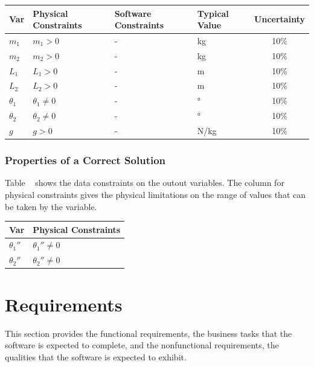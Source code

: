 \documentclass[12pt]{article}
\begin{document}
\begin{table}[H]
  \caption{Input Variables} \label{TblInputVar}
  \renewcommand{\arraystretch}{1.2}
\noindent \begin{longtable*}{l l l l c} 
  \toprule
  \textbf{Var} & \textbf{Physical Constraints} & \textbf{Software Constraints} &
                             \textbf{Typical Value} & \textbf{Uncertainty}\\
  \midrule 
  $m_1$ & $m_1 > 0$ & - & \si[per-mode=symbol] {\kilogram} & 10\%
  \\
  $m_2$ & $m_2 > 0$ & - & \si[per-mode=symbol] {\kilogram} & 10\%
  \\
  $L_1$ & $L_1 > 0$ & - & \si[per-mode=symbol] {\metre} & 10\%
  \\
  $L_2$ & $L_2 > 0$ & - & \si[per-mode=symbol] {\metre} & 10\%
  \\
  $\theta_1$ & $\theta_1 \neq 0$ & - & \si[per-mode=symbol] {\degree} & 10\%
  \\
  $\theta_2$ & $\theta_2 \neq 0$ & - & \si[per-mode=symbol] {\degree} & 10\%
  \\
  $g$ & $g > 0$ & - & \si[per-mode=symbol] {\newton\per\kilogram} & 10\%
  \\
  \bottomrule
\end{longtable*}
\end{table}

\subsubsection{Properties of a Correct Solution}\label{sec_corSol}
Table ~ shows the data constraints on the outout variables. The column for physical constraints gives the physical limitations on the range of values that can be taken by the variable.

\begin{table}[!h]
\caption{Output Variables} \label{TblOutputVar}
\renewcommand{\arraystretch}{1.2}
\noindent \begin{longtable*}{l l} 
  \toprule
  \textbf{Var} & \textbf{Physical Constraints} \\
  \midrule 
  ${\theta_1}''$ & ${\theta_1}'' \neq 0$\\
  ${\theta_2}''$ & ${\theta_2}'' \neq 0$\\
  \bottomrule
\end{longtable*}
\end{table}

\section{Requirements}\label{sec_req}
This section provides the functional requirements, the business tasks that the
software is expected to complete, and the nonfunctional requirements, the
qualities that the software is expected to exhibit.
\end{document}

